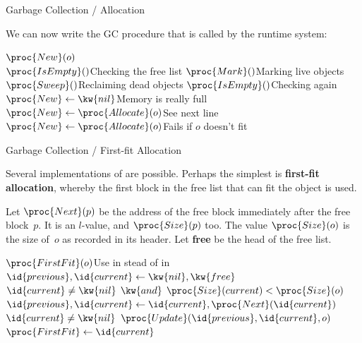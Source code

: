 \documentclass[compress,dvipdfmx]{beamer}
\begin{document}
%
\begin{frame}{Garbage Collection / Allocation}

  We can now write the GC procedure  that is called by the
  runtime system:
  \begin{codebox}
    \(\proc{New}(o)\)\\
    \li \If \(\proc{IsEmpty}()\)\RComment Checking the free list
    \li \Then \(\proc{Mark}()\)\RComment Marking live objects
    \li       \(\proc{Sweep}()\)\RComment Reclaiming dead objects
    \li       \If \(\proc{IsEmpty}()\)\RComment Checking again
    \li       \Then \(\proc{New} \gets \kw{nil}\)\RComment Memory is
    really full
    \li       \Else \(\proc{New} \gets \proc{Allocate}(o)\)\RComment See next line
              \End
    \li  \Else \(\proc{New} \gets \proc{Allocate}(o)\)\RComment Fails if \(o\)
    doesn't fit
         \End
  \end{codebox}

\end{frame}

%
\begin{frame}{Garbage Collection / First-fit Allocation}

  Several implementations of  are possible. Perhaps the
  simplest is \textbf{first-fit allocation}, whereby the first block
  in the free list that can fit the object is used.

  \bigskip

  Let \(\proc{Next}(p)\) be the address of the free block immediately
  after the free block~\(p\). It is an \(l\)\hyp{}value, and
  \(\proc{Size}(p)\) too. The value \(\proc{Size}(o)\) is the size
  of~\(o\) as recorded in its header. Let \textbf{free} be the head of
  the free list.
  \begin{codebox}
    \(\proc{FirstFit}(o)\)\RComment Use in stead of  in
    \\
    \li \(\id{previous}, \id{current} \gets \kw{nil}, \kw{free}\)
    \li \While \(\id{current} \neq \kw{nil}
               \,\; \kw{and} \,\; \proc{Size}(current) <
               \proc{Size}(o)\) 
    \li \> \(\id{previous}, \id{current}
    \gets \id{current}, \proc{Next}(\id{current})\)
    \End
    \li {} \(\id{current} \neq \kw{nil}\)  \(\proc{Update}(\id{previous},
    \id{current}, o)\)
    \li \(\proc{FirstFit} \gets \id{current}\)
  \end{codebox}

\end{frame}
\end{document}
